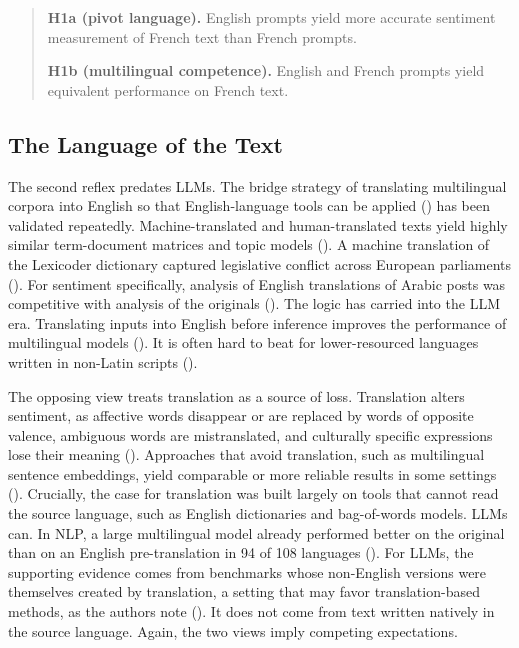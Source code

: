 \documentclass[
  man,
  floatsintext,
  longtable,
  nolmodern,
  notxfonts,
  notimes,
  colorlinks=true,linkcolor=blue,citecolor=blue,urlcolor=blue]{apa7}
\begin{document}
\begin{quote}
\textbf{H1a (pivot language).} English prompts yield more accurate
sentiment measurement of French text than French prompts.

\textbf{H1b (multilingual competence).} English and French prompts yield
equivalent performance on French text.
\end{quote}

\subsection{The Language of the Text}\label{the-language-of-the-text}

The second reflex predates LLMs. The bridge strategy of translating
multilingual corpora into English so that English-language tools can be
applied () has been validated repeatedly. Machine-translated and
human-translated texts yield highly similar term-document matrices and
topic models (). A machine translation of the Lexicoder dictionary captured
legislative conflict across European parliaments
(). For sentiment specifically, analysis of English translations of
Arabic posts was competitive with analysis of the originals
(). The
logic has carried into the LLM era. Translating inputs into English
before inference improves the performance of multilingual models
(). It is
often hard to beat for lower-resourced languages written in non-Latin
scripts ().

The opposing view treats translation as a source of loss. Translation
alters sentiment, as affective words disappear or are replaced by words
of opposite valence, ambiguous words are mistranslated, and culturally
specific expressions lose their meaning
().
Approaches that avoid translation, such as multilingual sentence
embeddings, yield comparable or more reliable results in some settings
(). Crucially, the case for translation was built largely on tools
that cannot read the source language, such as English dictionaries and
bag-of-words models. LLMs can. In NLP, a large multilingual model
already performed better on the original than on an English
pre-translation in 94 of 108 languages
(). For LLMs, the supporting evidence comes from benchmarks whose
non-English versions were themselves created by translation, a setting
that may favor translation-based methods, as the authors note
(). It does
not come from text written natively in the source language. Again, the
two views imply competing expectations.
\end{document}
